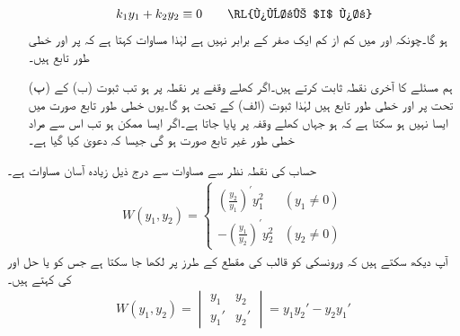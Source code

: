 \begin{enumerate}
\begin{align}\label{مساوات_سادہ_دو_درجی_ثبوت_ت}
k_1y_1+k_2y_2\equiv 0\quad \quad \text{\RL{پورے $I$ پر}}
\end{align}
ہو گا۔چونکہ  اور  میں کم از کم ایک صفر کے برابر نہیں ہے لہٰذا  مساوات  کہتا ہے کہ  پر  اور  خطی طور تابع ہیں۔
\item[(پ)]
ہم مسئلے کا آخری نقطہ ثابت کرتے ہیں۔اگر کھلے وقفے  پر نقطہ  پر  ہو تب ثبوت (ب) کے تحت  پر  اور  خطی طور تابع ہیں لہٰذا ثبوت (الف) کے تحت  ہو گا۔یوں خطی طور تابع صورت میں ایسا نہیں ہو سکتا ہے کہ  ہو جہاں  کھلے وقفہ  پر پایا جاتا ہے۔اگر ایسا ممکن ہو تب اس سے مراد خطی طور غیر تابع صورت ہو گی جیسا کہ دعویٰ کیا گیا ہے۔ 
\end{enumerate}

حساب کی نقطہ نظر سے  مساوات  سے درج ذیل زیادہ آسان مساوات ہے۔
\begin{align}\label{مساوات_سادہ_دو_آسان_ورونسکی}
W(y_1,y_2)=
\begin{cases}
\left(\frac{y_2}{y_1}\right)^{\!'}y_1^2  &(y_1 \ne 0)\\[0.5em]
-\left(\frac{y_1}{y_2}\right)^{\!'}y_2^2 & (y_2 \ne 0)
\end{cases}
\end{align}
آپ دیکھ سکتے ہیں کہ  ورونسکی کو قالب کی مقطع کے طرز پر لکھا جا سکتا ہے جس کو  یا حل  اور  کی  کہتے ہیں۔ 
\begin{align}
W(y_1,y_2)=
\begin{vmatrix}
y_1 &y_2\\[0.25em]
y_1' & y_2'
\end{vmatrix}
=y_1y_2'-y_2y_1'
\end{align}

